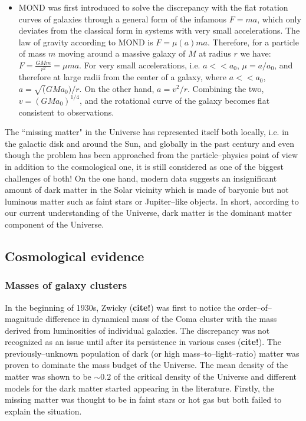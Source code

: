 \documentclass[paper=a4, fontsize=11pt]{scrartcl} %
\numberwithin{equation}{section} %
\numberwithin{figure}{section} %
\numberwithin{table}{section} %
\newcommand{\ignore}[1]{}
\begin{document}
\begin{itemize}
\item MOND was first introduced to solve the discrepancy with the flat rotation curves of galaxies through a general form of the infamous $F = ma$, which only deviates from the classical form in systems with very small accelerations. The law of gravity according to MOND is $F=\mu(a)ma$. Therefore, for a particle of mass $m$ moving around a massive galaxy of $M$ at radius $r$ we have: $F = \frac{GMm}{r^2} = \mu m a$. For very small accelerations, i.e. $a<<a_0$, $\mu = a/a_0$, and therefore at large radii from the center of a galaxy, where $a<<a_0$, $a=\sqrt(GMa_0)/r$. On the other hand, $a = v^2/r$. Combining the two, $v = (GMa_0)^\mathrm{1/4}$, and the rotational curve of the galaxy becomes flat consistent to observations.

\end{itemize}

The ``missing matter" in the Universe has represented itself both locally, i.e. in the galactic disk and around the Sun, and globally in the past century and even though the problem has been approached from the particle--physics point of view in addition to the cosmological one, it is still considered as one of the biggest challenges of both! On the one hand, modern data suggests an insignificant amount of dark matter in the Solar vicinity which is made of baryonic but not luminous matter such as faint stars or Jupiter--like objects. In short, according to our current understanding of the Universe, dark matter is the dominant matter component of the Universe.

\subsection{Cosmological evidence}
\subsubsection{Masses of galaxy clusters}
In the beginning of 1930s, Zwicky ({\bf cite!}) was first to notice the order--of--magnitude difference in dynamical mass of the Coma cluster with the mass derived from luminosities of individual galaxies. The discrepancy was not recognized as an issue until after its persistence in various cases ({\bf cite!})\ignore{cite Kahn \& Woltjer 1959 about the Andromeda's negative redshift and masses of galaxy groups Holmberg 1937! or rather just focus on rotational curve discrepancies whose agreement needs a new population of stars tenfold the regular ones in the galaxy with very large M/L  Einasto et al. 1974 ans Ostriker et al. 1974}. The previously--unknown population of dark (or high mass--to--light--ratio) matter was proven to dominate the mass budget of the Universe. The mean density of the matter was shown to be $\sim 0.2$ of the critical density of the Universe and different models for the dark matter started appearing in the literature. Firstly, the missing matter was thought to be in faint stars or hot gas but both failed to explain the situation\ignore{cite and explain why! or maybe not as it's not really important now!!}.
\end{document}
